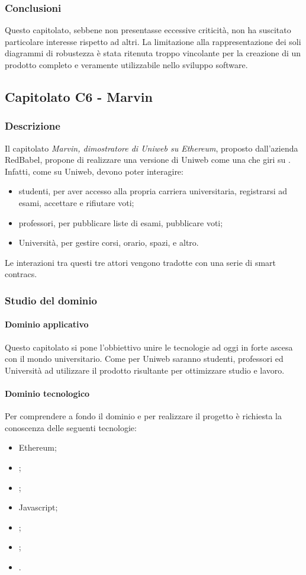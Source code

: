 		\subsubsection{Conclusioni}
		Questo capitolato, sebbene non presentasse eccessive criticità, non ha suscitato particolare interesse rispetto ad altri. La limitazione alla rappresentazione dei soli diagrammi di robustezza è stata ritenuta troppo vincolante per la creazione di un prodotto completo e veramente utilizzabile nello sviluppo software.
		
		
	\subsection{Capitolato C6 - Marvin}
		\subsubsection{Descrizione}
		Il capitolato \emph{Marvin, dimostratore di Uniweb su Ethereum}, proposto dall'azienda RedBabel, propone di realizzare una versione di Uniweb come una  che giri su . \\  Infatti, come su Uniweb, devono poter interagire:
		\begin{itemize} 
			\item studenti, per aver accesso alla propria carriera universitaria, registrarsi ad esami, accettare e rifiutare voti; 
			\item professori, per pubblicare liste di esami, pubblicare voti;
			\item Università, per gestire corsi, orario, spazi, e altro.
		\end{itemize}
	 	Le interazioni tra questi tre attori vengono tradotte con una serie di smart contracs.
		\subsubsection{Studio del dominio}
			\paragraph{Dominio applicativo} \Spazio
			Questo capitolato si pone l'obbiettivo unire le tecnologie ad oggi in forte ascesa con il mondo universitario. Come per Uniweb saranno studenti, professori ed Università ad utilizzare il prodotto risultante per ottimizzare studio e lavoro.
			\paragraph{Dominio tecnologico} \Spazio
			Per comprendere a fondo il dominio e per realizzare il progetto è richiesta la conoscenza delle seguenti tecnologie:
			\begin{itemize}
				\item Ethereum;
				\item {};
				\item {};
				\item Javascript;
				\item {};
				\item {};
				\item {}.
			\end{itemize}
